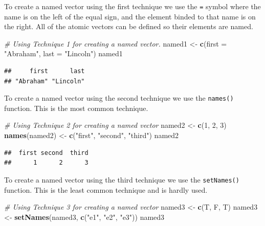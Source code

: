 \documentclass[
]{book}
\newenvironment{Shaded}{\begin{snugshade}}{\end{snugshade}}
\newcommand{\CommentTok}[1]{\textcolor[rgb]{0.56,0.35,0.01}{\textit{#1}}}
\newcommand{\DataTypeTok}[1]{\textcolor[rgb]{0.13,0.29,0.53}{#1}}
\newcommand{\DecValTok}[1]{\textcolor[rgb]{0.00,0.00,0.81}{#1}}
\newcommand{\KeywordTok}[1]{\textcolor[rgb]{0.13,0.29,0.53}{\textbf{#1}}}
\newcommand{\NormalTok}[1]{#1}
\newcommand{\StringTok}[1]{\textcolor[rgb]{0.31,0.60,0.02}{#1}}
\begin{document}
To create a named vector using the first technique we use the \texttt{=} symbol where the name is on the left of the equal sign, and the element binded to that name is on the right. All of the atomic vectors can be defined so their elements are named.

\begin{Shaded}
\begin{Highlighting}[]
\CommentTok{# Using Technique 1 for creating a named vector.}
\NormalTok{named1 <-}\StringTok{ }\KeywordTok{c}\NormalTok{(}\DataTypeTok{first =} \StringTok{"Abraham"}\NormalTok{, }\DataTypeTok{last =} \StringTok{"Lincoln"}\NormalTok{)}
\NormalTok{named1}
\end{Highlighting}
\end{Shaded}

\begin{verbatim}
##     first      last 
## "Abraham" "Lincoln"
\end{verbatim}

To create a named vector using the second technique we use the \texttt{names()} function. This is the most common technique.

\begin{Shaded}
\begin{Highlighting}[]
\CommentTok{# Using Technique 2 for creating a named vector}
\NormalTok{named2 <-}\StringTok{ }\KeywordTok{c}\NormalTok{(}\DecValTok{1}\NormalTok{, }\DecValTok{2}\NormalTok{, }\DecValTok{3}\NormalTok{)}
\KeywordTok{names}\NormalTok{(named2) <-}\StringTok{ }\KeywordTok{c}\NormalTok{(}\StringTok{"first"}\NormalTok{, }\StringTok{"second"}\NormalTok{, }\StringTok{"third"}\NormalTok{)}
\NormalTok{named2}
\end{Highlighting}
\end{Shaded}

\begin{verbatim}
##  first second  third 
##      1      2      3
\end{verbatim}

To create a named vector using the third technique we use the \texttt{setNames()} function. This is the least common technique and is hardly used.

\begin{Shaded}
\begin{Highlighting}[]
\CommentTok{# Using Technique 3 for creating a named vector}
\NormalTok{named3 <-}\StringTok{ }\KeywordTok{c}\NormalTok{(T, F, T)}
\NormalTok{named3 <-}\StringTok{ }\KeywordTok{setNames}\NormalTok{(named3, }\KeywordTok{c}\NormalTok{(}\StringTok{"e1"}\NormalTok{, }\StringTok{"e2"}\NormalTok{, }\StringTok{"e3"}\NormalTok{))}
\NormalTok{named3}
\end{Highlighting}
\end{Shaded}
\end{document}
